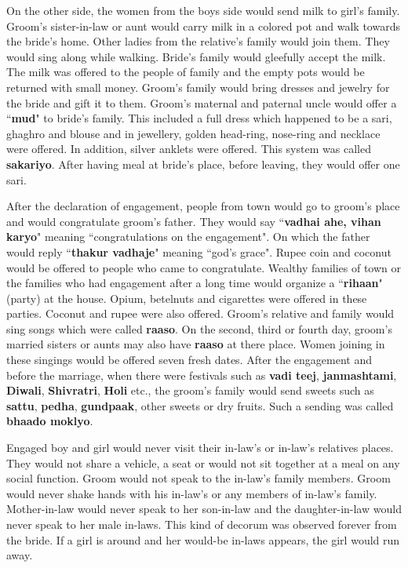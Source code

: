 On the other side, the women from the boys side would send milk to girl's
family. Groom's sister-in-law or aunt would carry milk in a colored pot and
walk towards the bride's home. Other ladies from the relative's family would
join them. They would sing along while walking. Bride's family would gleefully
accept the milk. The milk was offered to the people of family and the empty
pots would be returned with small money. Groom's family would bring dresses and
jewelry for the bride and gift it to them. Groom's maternal and paternal uncle
would offer a ``\textbf{mud}" to bride's family. This included a full dress
which happened to be a sari, ghaghro and blouse and in jewellery, golden
head-ring, nose-ring and necklace were offered. In addition, silver anklets
were offered. This system was called \textbf{sakariyo}. After having meal at
bride's place, before leaving, they would offer one sari.

After the declaration of engagement, people from town would go to groom's place
and would congratulate groom's father. They would say ``\textbf{vadhai ahe,
vihan karyo}" meaning ``congratulations on the engagement". On which the father
would reply ``\textbf{thakur vadhaje}" meaning ``god's grace". Rupee coin and
coconut would be offered to people who came to congratulate. Wealthy families
of town or the families who had engagement after a long time would organize a
``\textbf{rihaan}" (party) at the house. Opium, betelnuts and cigarettes were
offered in these parties. Coconut and rupee were also offered. Groom's relative
and family would sing songs which were called \textbf{raaso}. On the second,
third or fourth day, groom's married sisters or aunts may also have
\textbf{raaso} at there place. Women joining in these singings would be offered
seven fresh dates. After the engagement and before the marriage, when there
were festivals such as \textbf{vadi teej}, \textbf{janmashtami},
\textbf{Diwali}, \textbf{Shivratri}, \textbf{Holi} etc., the groom's family
would send sweets such as \textbf{sattu}, \textbf{pedha}, \textbf{gundpaak},
other sweets or dry fruits. Such a sending was called \textbf{bhaado moklyo}.

Engaged boy and girl would never visit their in-law's or in-law's relatives
places. They would not share a vehicle, a seat or would not sit together at a
meal on any social function. Groom would not speak to the in-law's family
members. Groom would never shake hands with his in-law's or any members of
in-law's family. Mother-in-law would never speak to her son-in-law and the
daughter-in-law would never speak to her male in-laws. This kind of decorum was
observed forever from the bride. If a girl is around and her would-be in-laws
appears, the girl would run away.

